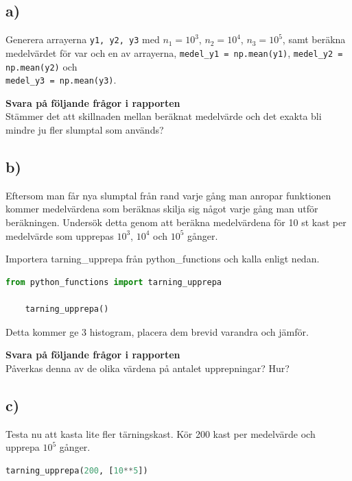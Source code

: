 \documentclass[a4paper]{article}
\begin{document}

\subsection{a)}
Generera arrayerna \lstinline{y1, y2, y3} med \( n_1=10^3 \), \( n_2=10^4 \), \( n_3=10^5 \),
samt beräkna medelvärdet för var och en av arrayerna, \lstinline{medel_y1 = np.mean(y1)},
\lstinline{medel_y2 = np.mean(y2)} och \\ \lstinline{medel_y3 = np.mean(y3)}.

\textbf{Svara på följande frågor i rapporten}\\
Stämmer det att skillnaden mellan beräknat medelvärde och det exakta bli mindre ju fler slumptal som används?


\subsection{b)}
\label{sec:2b}
Eftersom man får nya slumptal från rand varje gång man anropar funktionen kommer medelvärdena som
beräknas skilja sig något varje gång man utför beräkningen.
Undersök detta genom att beräkna medelvärdena för 10 st kast per medelvärde som upprepas \( 10^3 \),
\( 10^4 \) och \( 10^5 \) gånger.

Importera tarning\_upprepa från python\_functions och kalla enligt nedan.
\begin{lstlisting}[language=Python]
    from python_functions import tarning_upprepa

    tarning_upprepa()
\end{lstlisting}
Detta kommer ge 3 histogram, placera dem brevid varandra och jämför.

\textbf{Svara på följande frågor i rapporten}\\
Påverkas denna av de olika värdena på antalet upprepningar? Hur?


\subsection{c)}
Testa nu att kasta lite fler tärningskast. Kör 200 kast per medelvärde och upprepa \( 10^5 \) gånger.
\begin{lstlisting}[language=Python]
    tarning_upprepa(200, [10**5])
\end{lstlisting}
\end{document}
